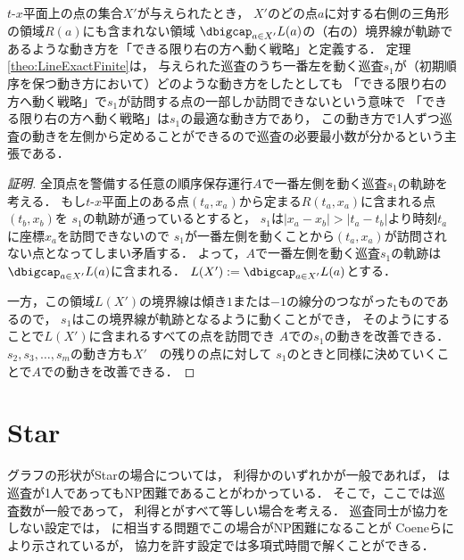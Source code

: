 $t$-$x$平面上の点の集合$X'$が与えられたとき，
$X'$のどの点$a$に対する右側の三角形の領域$R(a)$にも含まれない領域
$\dbigcap_{a \in X'} L(a)$の（右の）境界線が軌跡であるような動き方を「できる限り右の方へ動く戦略」と定義する．
%
定理\ref{theo:LineExactFinite}は，
与えられた巡査のうち一番左を動く巡査$s_1$が（初期順序を保つ動き方において）どのような動き方をしたとしても
「できる限り右の方へ動く戦略」で$s_1$が訪問する点の一部しか訪問できないという意味で
「できる限り右の方へ動く戦略」は$s_1$の最適な動き方であり，
この動き方で1人ずつ巡査の動きを左側から定めることができるので巡査の必要最小数が分かるという主張である．




\begin{proof}[証明]
全頂点を警備する任意の順序保存運行$A$で一番左側を動く巡査$s_1$の軌跡を考える．
%
もし$t$-$x$平面上のある点$(t_a,x_a)$から定まる$R(t_a,x_a)$に含まれる点$(t_b,x_b)$を
$s_1$の軌跡が通っているとすると，
$s_1$は$|x_a - x_b| > |t_a - t_b|$より時刻$t_a$に座標$x_a$を訪問できないので
$s_1$が一番左側を動くことから$(t_a,x_a)$が訪問されない点となってしまい矛盾する．
%
よって，$A$で一番左側を動く巡査$s_1$の軌跡は$\dbigcap_{a \in X'} L(a)$に含まれる．
$L(X') := \dbigcap_{a \in X'} L(a)$とする．

一方，この領域$L(X')$の境界線は傾き$1$または$-1$の線分のつながったものであるので，
$s_1$はこの境界線が軌跡となるように動くことができ，
そのようにすることで$L(X')$に含まれるすべての点を訪問でき
$A$での$s_1$の動きを改善できる．
%
$s_2, s_3, \ldots, s_m$の動き方も$X'$　の残りの点に対して
$s_1$のときと同様に決めていくことで$A$での動きを改善できる．


\end{proof}









\section{Star}
グラフの形状がStarの場合については，
利得か{\timelimit}のいずれかが一般であれば，
{\patrolling}は巡査が1人であってもNP困難であることがわかっている\cite{coene2011charlemagne}．
そこで，ここでは巡査数が一般であって，
利得と{\timelimit}がすべて等しい場合を考える．
巡査同士が協力をしない設定では，
{\decisionpp}に相当する問題でこの場合がNP困難になることが
Coeneら\cite{coene2011charlemagne}により示されているが，
協力を許す設定では多項式時間で解くことができる．

